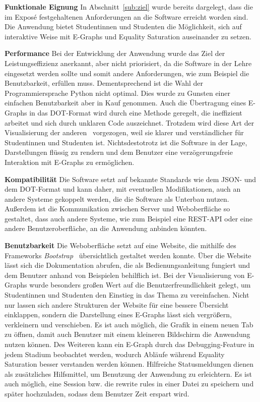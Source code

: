 \noindent\textbf{Funktionale Eignung} In Abschnitt~\ref{sub:ziel} wurde bereits dargelegt, dass die im Exposé festgehaltenen Anforderungen an die Software erreicht worden sind.
Die Anwendung bietet Studentinnen und Studenten die Möglichkeit, sich auf interaktive Weise mit E-Graphs und Equality Saturation auseinander zu setzen.

\noindent\textbf{Performance} Bei der Entwicklung der Anwendung wurde das Ziel der Leistungseffizienz anerkannt, aber nicht priorisiert, da die Software in der Lehre eingesetzt werden sollte
und somit andere Anforderungen, wie zum Beispiel die Benutzbarkeit, erfüllen muss. Dementsprechend ist die Wahl der Programmiersprache Python nicht optimal. Dies wurde zu Gunsten einer einfachen Benutzbarkeit
aber in Kauf genommen.
Auch die Übertragung eines E-Graphs in das DOT-Format wird durch eine Methode geregelt, die ineffizient arbeitet und sich durch unklaren Code auszeichnet. Trotzdem wird diese Art der Visualisierung
der anderen~\cite{devito} vorgezogen, weil sie klarer und verständlicher für Studentinnen und Studenten ist.
Nichtsdestotrotz ist die Software in der Lage, Darstellungen flüssig zu rendern und dem Benutzer eine verzögerungsfreie Interaktion mit E-Graphs zu ermöglichen.

\noindent\textbf{Kompatibilität} Die Software setzt auf bekannte Standards wie dem JSON- und dem DOT-Format und kann daher, mit eventuellen Modifikationen, auch an andere Systeme gekoppelt werden, die 
die Software als Unterbau nutzen.
Außerdem ist die Kommunikation zwischen Server und Weboberfläche so gestaltet, dass auch andere Systeme, wie zum Beispiel eine REST-API oder eine andere Benutzeroberfläche, an die Anwendung anbinden könnten.

\noindent\textbf{Benutzbarkeit} Die Weboberfläche setzt auf eine Website, die mithilfe des Frameworks \textit{Bootstrap}~\cite{bootstrap} übersichtlich gestaltet werden konnte.
Über die Website lässt sich die Dokumentation abrufen, die als Bedienungsanleitung fungiert und dem Benutzer anhand von Beispielen behilflich ist.
Bei der Visualisierung von E-Graphs wurde besonders großen Wert auf die Benutzerfreundlichkeit gelegt, um Studentinnen und Studenten den Einstieg in das Thema zu vereinfachen.
Nicht nur lassen sich andere Strukturen der Website für eine bessere Übersicht 
einklappen, sondern die Darstellung eines E-Graphs lässt sich vergrößern, verkleinern und verschieben. Es ist auch möglich, die Grafik in einem neuen Tab zu öffnen, damit auch Benutzer
mit einem kleineren Bildschirm die Anwendung nutzen können.
Des Weiteren kann ein E-Graph durch das Debugging-Feature in jedem Stadium beobachtet werden, wodurch Abläufe während Equality Saturation besser verstanden werden können.
Hilfreiche Statusmeldungen dienen als zusätzliches Hilfsmittel, um Benutzung der Anwendung zu erleichtern.
Es ist auch möglich, eine Session bzw. die rewrite rules in einer Datei zu speichern und später hochzuladen, sodass dem Benutzer Zeit erspart wird.

